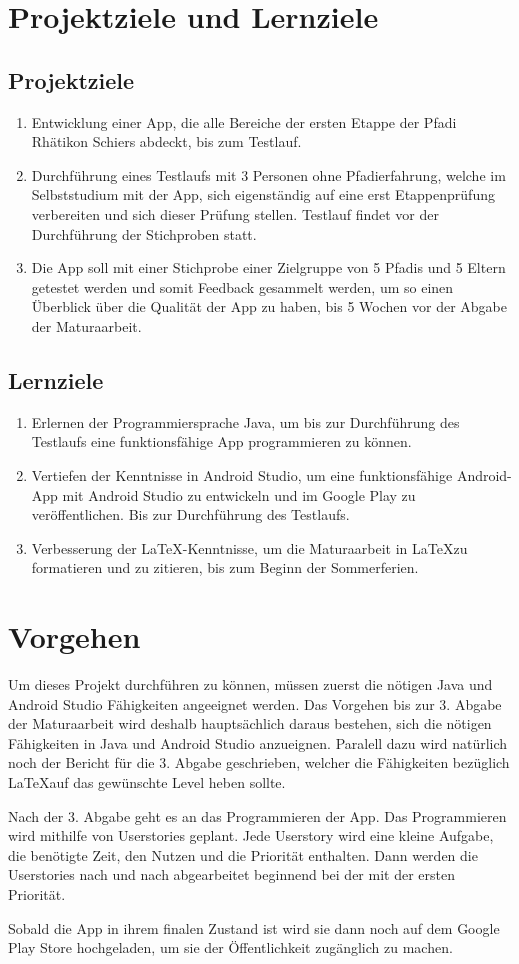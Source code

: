 \section{Projektziele und Lernziele}
\subsection*{Projektziele}
\begin{enumerate}
    \item Entwicklung einer App, die alle Bereiche der ersten Etappe der Pfadi Rhätikon Schiers abdeckt, bis zum Testlauf.
    \item Durchführung eines Testlaufs mit 3 Personen ohne Pfadierfahrung, welche im Selbststudium mit der App, sich eigenständig auf eine erst Etappenprüfung verbereiten und sich dieser Prüfung stellen. Testlauf findet vor der Durchführung der Stichproben statt.
    \item Die App soll mit einer Stichprobe einer Zielgruppe von 5 Pfadis und 5 Eltern getestet werden und somit Feedback gesammelt werden, um so einen Überblick über die Qualität der App zu haben, bis 5 Wochen vor der Abgabe der Maturaarbeit.
\end{enumerate}
\subsection*{Lernziele}
\begin{enumerate}
    \item Erlernen der Programmiersprache Java, um bis zur Durchführung des Testlaufs eine funktionsfähige App programmieren zu können.
    \item Vertiefen der Kenntnisse in Android Studio, um eine funktionsfähige Android-App mit Android Studio zu entwickeln und im Google Play zu veröffentlichen. Bis zur Durchführung des Testlaufs.
    \item Verbesserung der LaTeX-Kenntnisse, um die Maturaarbeit in \LaTeX zu formatieren und zu zitieren, bis zum Beginn der Sommerferien.
\end{enumerate}

\section{Vorgehen}
Um dieses Projekt durchführen zu können, müssen zuerst die nötigen Java und Android Studio Fähigkeiten angeeignet werden. Das Vorgehen bis zur 3. Abgabe der Maturaarbeit wird deshalb hauptsächlich daraus bestehen, sich die nötigen Fähigkeiten in Java und Android Studio anzueignen. Paralell dazu wird natürlich noch der Bericht für die 3. Abgabe geschrieben, welcher die Fähigkeiten bezüglich \LaTeX auf das gewünschte Level heben sollte. \par
Nach der 3. Abgabe geht es an das Programmieren der App. Das Programmieren wird mithilfe von Userstories geplant. Jede Userstory wird eine kleine Aufgabe, die benötigte Zeit, den Nutzen und die Priorität enthalten. Dann werden die Userstories nach und nach abgearbeitet beginnend bei der mit der ersten Priorität. \par
Sobald die App in ihrem finalen Zustand ist wird sie dann noch auf dem Google Play Store hochgeladen, um sie der Öffentlichkeit zugänglich zu machen.
